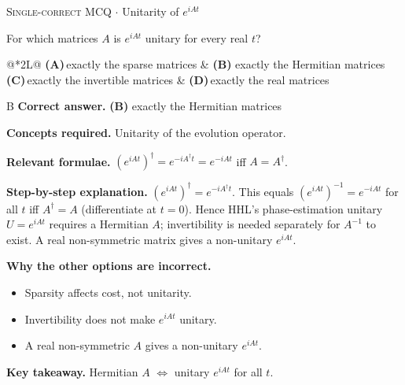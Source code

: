 \documentclass[11pt,a4paper]{article}
\newcommand{\optlabel}[1]{\textbf{(#1)}}
\newcommand{\correctlabel}[1]{\textcolor{okgreen}{\textbf{(#1)}\,\ding{51}}}
\newenvironment{qitem}[1]{\begin{list}{}{\setlength{\leftmargin}{3.3em}\setlength{\labelwidth}{3.1em}%
  \setlength{\labelsep}{0.2em}\setlength{\topsep}{3pt}\setlength{\parsep}{3pt}}\item[\textbf{Q.#1}\hfill]}{\end{list}}
\newcommand{\qsep}{\par\vspace{2pt}{\color{black!15}\hrule}\vspace{4pt}}
\newcommand{\qmeta}[2]{{\footnotesize\color{black!60}\textsc{#1} \;$\cdot$\; #2}\par}
\begin{document}
\begin{qitem}{17}
\qmeta{Single-correct MCQ}{Unitarity of $e^{iAt}$}
For which matrices $A$ is $e^{iAt}$ unitary for every real $t$?
\par\smallskip\noindent\begin{tabularx}{\linewidth}{@{}*{2}{L}@{}}
\optlabel{A}\,exactly the sparse matrices & \correctlabel{B}\,exactly the Hermitian matrices \\[3pt]
\optlabel{C}\,exactly the invertible matrices & \optlabel{D}\,exactly the real matrices
\end{tabularx}
\end{qitem}
\begin{solbox}{B}
\textbf{\color{brand}Correct answer.} \textcolor{okgreen}{\textbf{(B)}} exactly the Hermitian matrices

\textbf{\color{brand}Concepts required.} Unitarity of the evolution operator.

\textbf{\color{brand}Relevant formulae.} $(e^{iAt})^\dagger = e^{-iA^\dagger t} = e^{-iAt}$ iff $A = A^\dagger$.

\textbf{\color{brand}Step-by-step explanation.} $(e^{iAt})^\dagger = e^{-iA^\dagger t}$. This equals $(e^{iAt})^{-1} = e^{-iAt}$ for all $t$ iff $A^\dagger = A$ (differentiate at $t = 0$). Hence HHL's phase-estimation unitary
$U = e^{iAt}$ requires a Hermitian $A$; invertibility is needed separately for $A^{-1}$ to exist. A real non-symmetric matrix gives a non-unitary $e^{iAt}$.

\textbf{\color{brand}Why the other options are incorrect.}
\begin{itemize}[leftmargin=2.4em, itemsep=1pt, topsep=2pt]
\item[\textbf{(A)}] Sparsity affects cost, not unitarity.
\item[\textbf{(C)}] Invertibility does not make $e^{iAt}$ unitary.
\item[\textbf{(D)}] A real non-symmetric $A$ gives a non-unitary $e^{iAt}$.
\end{itemize}
\textbf{\color{brand}Key takeaway.} Hermitian $A$ $\Leftrightarrow$ unitary $e^{iAt}$ for all $t$.
\end{solbox}
\qsep
\end{document}
